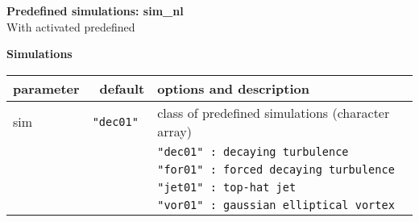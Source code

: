 \vspace{0.5cm}
\noindent
{\bf \Large Predefined simulations: sim{\_}nl} \\
With activated predefined     

{\bf Simulations} \\
\noindent
\begin{tabular}{|l|r|l|}
 \hline
 parameter & default & options and description \\
 \hline
 sim          &  \tt{"dec01"} & class of predefined simulations (character array) \\
              &                & \tt{"dec01"} : decaying turbulence \\
              &                & \tt{"for01"} : forced decaying turbulence \\
              &                & \tt{"jet01"} : top-hat jet \\
              &                & \tt{"vor01"} : gaussian elliptical vortex \\
 \hline
\end{tabular}
